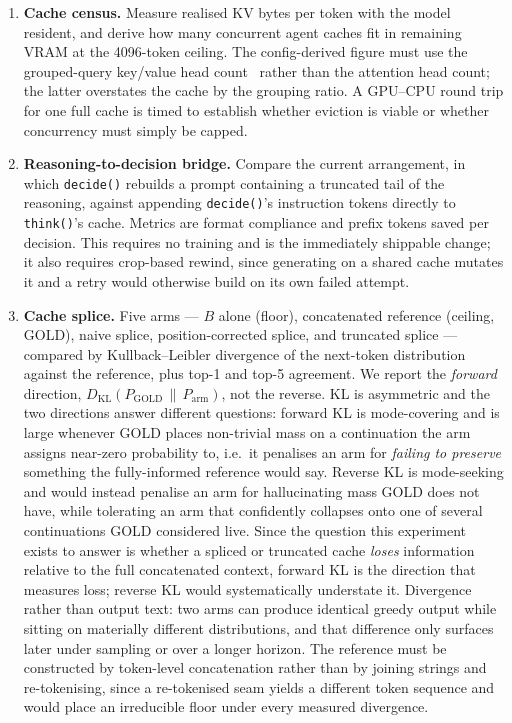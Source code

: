 \documentclass[11pt]{article}
\begin{document}
\begin{enumerate}
\item \textbf{Cache census.} Measure realised KV bytes per token with the model
      resident, and derive how many concurrent agent caches fit in remaining
      VRAM at the 4096-token ceiling. The config-derived figure must use the
      grouped-query key/value head count~\cite{ainslie2023gqa} rather than the
      attention head count; the latter overstates the cache by the grouping
      ratio. A GPU--CPU round trip for one full cache is timed to establish
      whether eviction is viable or whether concurrency must simply be capped.
\item \textbf{Reasoning-to-decision bridge.} Compare the current arrangement,
      in which \texttt{decide()} rebuilds a prompt containing a truncated tail
      of the reasoning, against appending \texttt{decide()}'s instruction
      tokens directly to \texttt{think()}'s cache. Metrics are format
      compliance and prefix tokens saved per decision. This requires no
      training and is the immediately shippable change; it also requires
      crop-based rewind, since generating on a shared cache mutates it and a
      retry would otherwise build on its own failed attempt.
\item \textbf{Cache splice.} Five arms --- $B$ alone (floor), concatenated
      reference (ceiling, GOLD), naive splice, position-corrected splice, and
      truncated splice --- compared by Kullback--Leibler divergence of the
      next-token distribution against the reference, plus top-1 and top-5
      agreement. We report the \emph{forward} direction,
      $D_{\mathrm{KL}}(P_{\mathrm{GOLD}} \,\|\, P_{\mathrm{arm}})$, not the
      reverse. KL is asymmetric and the two directions answer different
      questions: forward KL is mode-covering and is large whenever GOLD places
      non-trivial mass on a continuation the arm assigns near-zero probability
      to, i.e.\ it penalises an arm for \emph{failing to preserve} something
      the fully-informed reference would say. Reverse KL is mode-seeking and
      would instead penalise an arm for hallucinating mass GOLD does not have,
      while tolerating an arm that confidently collapses onto one of several
      continuations GOLD considered live. Since the question this experiment
      exists to answer is whether a spliced or truncated cache \emph{loses}
      information relative to the full concatenated context, forward KL is the
      direction that measures loss; reverse KL would systematically understate
      it. Divergence rather than output text: two arms can produce identical
      greedy output while sitting on materially different distributions, and
      that difference only surfaces later under sampling or over a longer
      horizon. The reference must be constructed by token-level concatenation
      rather than by joining strings and re-tokenising, since a re-tokenised
      seam yields a different token sequence and would place an irreducible
      floor under every measured divergence.
\end{enumerate}
\end{document}
